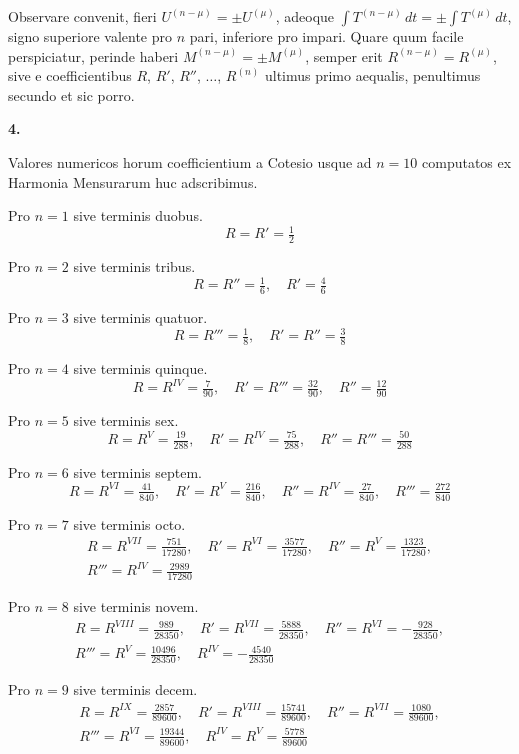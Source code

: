 \documentclass[12pt,a4paper]{article}
\newcommand{\art}[1]{\par\medskip\noindent\textbf{#1.}\par\nopagebreak\smallskip}
\begin{document}
Observare convenit, fieri $U^{(n-\mu)}=\pm U^{(\mu)}$, adeoque $\int\!T^{(n-\mu)}\,dt=\pm\int\!T^{(\mu)}\,dt$, signo superiore valente pro $n$ pari, inferiore pro impari. Quare quum facile perspiciatur, perinde haberi $M^{(n-\mu)}=\pm M^{(\mu)}$, semper erit $R^{(n-\mu)}=R^{(\mu)}$, sive e coefficientibus $R$, $R'$, $R''$, $\ldots$, $R^{(n)}$ ultimus primo aequalis, penultimus secundo et sic porro.

\art{4}

Valores numericos horum coefficientium a Cotesio usque ad $n=10$ computatos ex Harmonia Mensurarum huc adscribimus.

Pro $n=1$ sive terminis duobus.
\[
R = R' = \tfrac{1}{2}
\]

Pro $n=2$ sive terminis tribus.
\[
R = R'' = \tfrac{1}{6},\quad R' = \tfrac{4}{6}
\]

Pro $n=3$ sive terminis quatuor.
\[
R = R''' = \tfrac{1}{8},\quad R' = R'' = \tfrac{3}{8}
\]

Pro $n=4$ sive terminis quinque.
\[
R = R^{IV} = \tfrac{7}{90},\quad R' = R''' = \tfrac{32}{90},\quad R'' = \tfrac{12}{90}
\]

Pro $n=5$ sive terminis sex.
\[
R = R^{V} = \tfrac{19}{288},\quad R' = R^{IV} = \tfrac{75}{288},\quad R'' = R''' = \tfrac{50}{288}
\]

Pro $n=6$ sive terminis septem.
\[
R = R^{VI} = \tfrac{41}{840},\quad R' = R^{V} = \tfrac{216}{840},\quad R'' = R^{IV} = \tfrac{27}{840},\quad R''' = \tfrac{272}{840}
\]

Pro $n=7$ sive terminis octo.
\begin{multline*}
R = R^{VII} = \tfrac{751}{17280},\quad R' = R^{VI} = \tfrac{3577}{17280},\quad R'' = R^{V} = \tfrac{1323}{17280},\\
R''' = R^{IV} = \tfrac{2989}{17280}
\end{multline*}

Pro $n=8$ sive terminis novem.
\begin{multline*}
R = R^{VIII} = \tfrac{989}{28350},\quad R' = R^{VII} = \tfrac{5888}{28350},\quad R'' = R^{VI} = -\tfrac{928}{28350},\\
R''' = R^{V} = \tfrac{10496}{28350},\quad R^{IV} = -\tfrac{4540}{28350}
\end{multline*}

Pro $n=9$ sive terminis decem.
\begin{multline*}
R = R^{IX} = \tfrac{2857}{89600},\quad R' = R^{VIII} = \tfrac{15741}{89600},\quad R'' = R^{VII} = \tfrac{1080}{89600},\\
R''' = R^{VI} = \tfrac{19344}{89600},\quad R^{IV} = R^{V} = \tfrac{5778}{89600}
\end{multline*}
\end{document}

